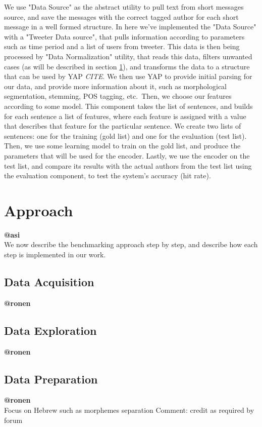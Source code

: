 \documentclass[a4paper]{article}
\begin{document}
We use "Data Source" as the abstract utility to pull text from short messages source, and save the messages with the correct tagged author for each short message in a well formed structure.
In here we've implemented the "Data Source" with a "Tweeter Data source", that pulls information according to parameters such as time period and a list of users from tweeter.
This data is then being processed by "Data Normalization" utility, that reads this data, filters unwanted cases (as will be described in section \ref{Approach}), and transforms the data to a structure that can be used by YAP \emph{CITE}.
We then use YAP to provide initial parsing for our data, and provide more information about it, such as morphological segmentation, stemming, POS tagging, etc.\
Then, we choose our features according to some model. This component takes the list of sentences, and builds for each sentence a list of features, where each feature is assigned with a value that describes that feature for the particular sentence.
We create two lists of sentences: one for the training (gold list) and one for the evaluation (test list).
Then, we use some learning model to train on the gold list, and produce the parameters that will be used for the encoder.
Lastly, we use the encoder on the test list, and compare its results with the actual authors from the test list using the evaluation component, to test the system's accuracy (hit rate).

\section{Approach}
\label{Approach}
\textbf{@asi}\\
We now describe the benchmarking approach step by step, and describe how each step is implemented in our work.
\subsection{Data Acquisition}
\textbf{@ronen}\\
\subsection{Data Exploration}
\textbf{@ronen}\\
\subsection{Data Preparation}
\textbf{@ronen}\\
Focus on Hebrew such as morphemes separation
Comment: credit as required by forum
\end{document}
